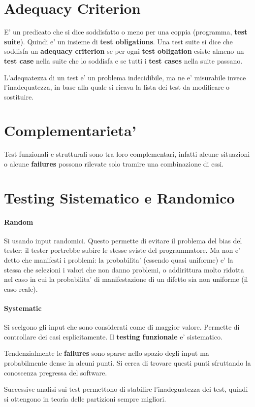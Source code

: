 \section{Adequacy Criterion}

E' un predicato che si dice soddisfatto o meno per una coppia (programma, \textbf{test suite}).
Quindi e' un insieme di \textbf{test obligations}.
Una test suite si dice che soddisfa un \textbf{adequacy criterion} se per ogni \textbf{test obligation} esiste almeno un \textbf{test case} nella suite che lo soddisfa e se tutti i \textbf{test cases} nella suite passano.

L'adequatezza di un test e' un problema indecidibile, ma ne e' misurabile invece l'inadequatezza, in base alla quale si ricava la lista dei test da modificare o sostituire.

\section{Complementarieta'}

Test funzionali e strutturali sono tra loro complementari, infatti alcune situazioni o alcune \textbf{failures} possono rilevate solo tramire una combinazione di essi.

\section{Testing Sistematico e Randomico}

\paragraph{Random}

Si usando input randomici. Questo permette di evitare il problema del bias del tester: il tester portrebbe subire le stesse sviste del programmatore. Ma non e' detto che manifesti i problemi: la probabilita' (essendo quasi uniforme) e' la stessa che selezioni i valori che non danno problemi, o addirittura molto ridotta nel caso in cui la probabilita' di manifestazione di un difetto sia non uniforme (il caso reale).

\paragraph{Systematic}

Si scelgono gli input che sono considerati come di maggior valore. Permette di controllare dei casi esplicitamente.
Il \textbf{testing funzionale} e' sistematico.

Tendenzialmente le \textbf{failures} sono sparse nello spazio degli input ma probabilmente dense in alcuni punti. Si cerca di trovare questi punti sfruttando la conoscenza pregressa del software.

Successive analisi sui test permettono di stabilire l'inadeguatezza dei test, quindi si ottengono in teoria delle partizioni sempre migliori.
